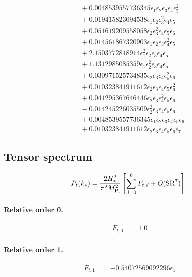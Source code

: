 \documentclass[10pt]{article}
\begin{document}
\begin{align*}
&{}  + 0.0048539557736345 \epsilon_{1} \epsilon_{2} \epsilon_{3} \epsilon_{4} \epsilon_{5}^{2} \\
&{}  + 0.019415823094538 \epsilon_{1} \epsilon_{2} \epsilon_{3}^{2} \epsilon_{4} \epsilon_{5} \\
&{}  + 0.051619209558058 \epsilon_{2} \epsilon_{3}^{2} \epsilon_{4} \epsilon_{5} \epsilon_{6} \\
&{}  + 0.014561867320903 \epsilon_{1} \epsilon_{2} \epsilon_{3} \epsilon_{4}^{2} \epsilon_{5} \\
&{}  + 2.1503772818914 \epsilon_{1}^{2} \epsilon_{2} \epsilon_{3} \epsilon_{4} \epsilon_{5} \\
&{}  + 1.1312985085359 \epsilon_{1} \epsilon_{2}^{2} \epsilon_{3} \epsilon_{4} \epsilon_{5} \\
&{}  + 0.030971525734835 \epsilon_{2} \epsilon_{3} \epsilon_{4} \epsilon_{5}^{2} \epsilon_{6} \\
&{}  + 0.010323841911612 \epsilon_{2} \epsilon_{3} \epsilon_{4} \epsilon_{5} \epsilon_{6}^{2} \\
&{}  + 0.041295367646446 \epsilon_{2} \epsilon_{3} \epsilon_{4}^{2} \epsilon_{5} \epsilon_{6} \\
&{}  - 0.014245226035509 \epsilon_{2}^{2} \epsilon_{3} \epsilon_{4} \epsilon_{5} \epsilon_{6} \\
&{}  + 0.0048539557736345 \epsilon_{1} \epsilon_{2} \epsilon_{3} \epsilon_{4} \epsilon_{5} \epsilon_{6} \\
&{}  + 0.010323841911612 \epsilon_{2} \epsilon_{3} \epsilon_{4} \epsilon_{5} \epsilon_{6} \epsilon_{7}
\end{align*}

\subsection{Tensor spectrum}
\[P_t(k_*)=\frac{2H_*^2}{\pi^2M_{\rm Pl}^2}\left[\sum_{d=0}^{6}F_{t,d}+O(\mathrm{SR}^{7})\right].\]
\paragraph{Relative order 0.}
\begin{align*}
F_{t,0} &= 1.0
\end{align*}

\paragraph{Relative order 1.}
\begin{align*}
F_{t,1} &=  - 0.54072569092296 \epsilon_{1}
\end{align*}
\end{document}

